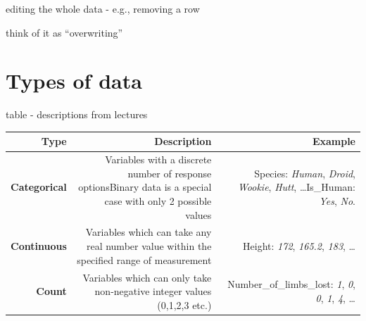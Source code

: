 \documentclass[]{book}
\begin{document}
editing the whole data - e.g., removing a row

think of it as ``overwriting''

\hypertarget{types-of-data}{%
\section{Types of data}\label{types-of-data}}

table - descriptions from lectures

\begin{longtable}[]{@{}rrr@{}}
\toprule
\begin{minipage}[b]{0.30\columnwidth}\raggedleft
\textbf{Type}\strut
\end{minipage} & \begin{minipage}[b]{0.30\columnwidth}\raggedleft
\textbf{Description}\strut
\end{minipage} & \begin{minipage}[b]{0.30\columnwidth}\raggedleft
\textbf{Example}\strut
\end{minipage}\tabularnewline
\midrule
\endhead
\begin{minipage}[t]{0.30\columnwidth}\raggedleft
\textbf{Categorical}\strut
\end{minipage} & \begin{minipage}[t]{0.30\columnwidth}\raggedleft
Variables with a discrete number of response optionsBinary data is a special case with only 2 possible values\strut
\end{minipage} & \begin{minipage}[t]{0.30\columnwidth}\raggedleft
Species: \emph{Human}, \emph{Droid}, \emph{Wookie}, \emph{Hutt}, \ldots{}Is\_Human: \emph{Yes}, \emph{No}.\strut
\end{minipage}\tabularnewline
\begin{minipage}[t]{0.30\columnwidth}\raggedleft
\textbf{Continuous}\strut
\end{minipage} & \begin{minipage}[t]{0.30\columnwidth}\raggedleft
Variables which can take any real number value within the specified range of measurement\strut
\end{minipage} & \begin{minipage}[t]{0.30\columnwidth}\raggedleft
Height: \emph{172}, \emph{165.2}, \emph{183}, \ldots{}\strut
\end{minipage}\tabularnewline
\begin{minipage}[t]{0.30\columnwidth}\raggedleft
\textbf{Count}\strut
\end{minipage} & \begin{minipage}[t]{0.30\columnwidth}\raggedleft
Variables which can only take non-negative integer values (0,1,2,3 etc.)\strut
\end{minipage} & \begin{minipage}[t]{0.30\columnwidth}\raggedleft
Number\_of\_limbs\_lost: \emph{1}, \emph{0}, \emph{0}, \emph{1}, \emph{4}, \ldots{}\strut
\end{minipage}\tabularnewline
\bottomrule
\end{longtable}
\end{document}
